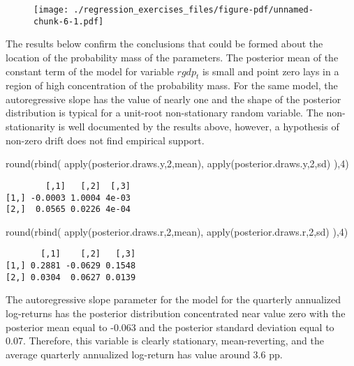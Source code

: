 \documentclass[
  letterpaper,
  DIV=11,
  numbers=noendperiod]{scrreprt}
\newenvironment{Shaded}{\begin{snugshade}}{\end{snugshade}}
\newcommand{\DecValTok}[1]{\textcolor[rgb]{0.68,0.00,0.00}{#1}}
\newcommand{\FunctionTok}[1]{\textcolor[rgb]{0.28,0.35,0.67}{#1}}
\newcommand{\NormalTok}[1]{\textcolor[rgb]{0.00,0.23,0.31}{#1}}
\begin{document}
\begin{figure}[H]

{\centering \texttt{[image: ./regression\_exercises\_files/figure-pdf/unnamed-chunk-6-1.pdf]}

}

\end{figure}

The results below confirm the conclusions that could be formed about the
location of the probability mass of the parameters. The posterior mean
of the constant term of the model for variable \(rgdp_t\) is small and
point zero lays in a region of high concentration of the probability
mass. For the same model, the autoregressive slope has the value of
nearly one and the shape of the posterior distribution is typical for a
unit-root non-stationary random variable. The non-stationarity is well
documented by the results above, however, a hypothesis of non-zero drift
does not find empirical support.

\begin{Shaded}
\begin{Highlighting}[]
\FunctionTok{round}\NormalTok{(}\FunctionTok{rbind}\NormalTok{(}
  \FunctionTok{apply}\NormalTok{(posterior.draws.y,}\DecValTok{2}\NormalTok{,mean),}
  \FunctionTok{apply}\NormalTok{(posterior.draws.y,}\DecValTok{2}\NormalTok{,sd)}
\NormalTok{),}\DecValTok{4}\NormalTok{)}
\end{Highlighting}
\end{Shaded}

\begin{verbatim}
        [,1]   [,2]  [,3]
[1,] -0.0003 1.0004 4e-03
[2,]  0.0565 0.0226 4e-04
\end{verbatim}

\begin{Shaded}
\begin{Highlighting}[]
\FunctionTok{round}\NormalTok{(}\FunctionTok{rbind}\NormalTok{(}
  \FunctionTok{apply}\NormalTok{(posterior.draws.r,}\DecValTok{2}\NormalTok{,mean),}
  \FunctionTok{apply}\NormalTok{(posterior.draws.r,}\DecValTok{2}\NormalTok{,sd)}
\NormalTok{),}\DecValTok{4}\NormalTok{)}
\end{Highlighting}
\end{Shaded}

\begin{verbatim}
       [,1]    [,2]   [,3]
[1,] 0.2881 -0.0629 0.1548
[2,] 0.0304  0.0627 0.0139
\end{verbatim}

The autoregressive slope parameter for the model for the quarterly
annualized log-returns has the posterior distribution concentrated near
value zero with the posterior mean equal to -0.063 and the posterior
standard deviation equal to 0.07. Therefore, this variable is clearly
stationary, mean-reverting, and the average quarterly annualized
log-return has value around 3.6 pp.
\end{document}
